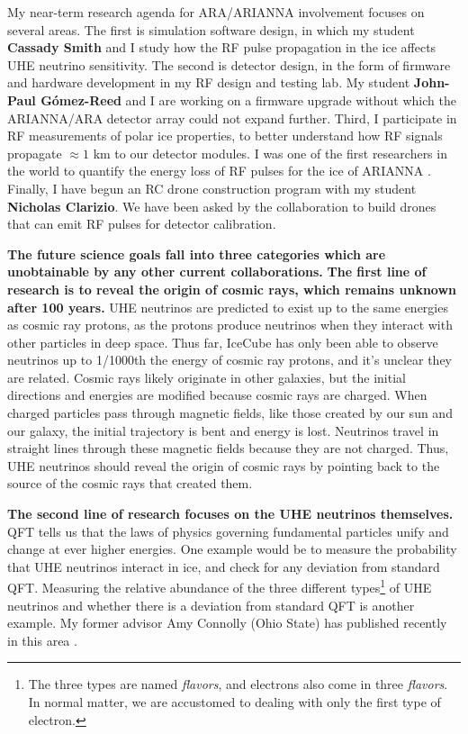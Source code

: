 \documentclass[../../main.tex]{subfiles}
\begin{document}
My near-term research agenda for ARA/ARIANNA involvement focuses on several areas.  The first is simulation software design, in which my student \textbf{Cassady Smith} and I study how the RF pulse propagation in the ice affects UHE neutrino sensitivity.  The second is detector design, in the form of firmware and hardware development in my RF design and testing lab.  My student \textbf{John-Paul G\'{o}mez-Reed} and I are working on a firmware upgrade without which the ARIANNA/ARA detector array could not expand further.  Third, I participate in RF measurements of polar ice properties, to better understand how RF signals propagate $\approx 1$ km to our detector modules.  I was one of the first researchers in the world to quantify the energy loss of RF pulses for the ice of ARIANNA \cite{hanson2015}. Finally, I have begun an RC drone construction program with my student \textbf{Nicholas Clarizio}.  We have been asked by the collaboration to build drones that can emit RF pulses for detector calibration.  \\ \hspace{0.1cm}

\textbf{The future science goals fall into three categories which are unobtainable by any other current collaborations.}  \textbf{The first line of research is to reveal the origin of cosmic rays, which remains unknown after 100 years.}  UHE neutrinos are predicted to exist up to the same energies as cosmic ray protons, as the protons produce neutrinos when they interact with other particles in deep space.  Thus far, IceCube has only been able to observe neutrinos up to 1/1000th the energy of cosmic ray protons, and it's unclear they are related.  Cosmic rays likely originate in other galaxies, but the initial directions and energies are modified because cosmic rays are charged.  When charged particles pass through magnetic fields, like those created by our sun and our galaxy, the initial trajectory is bent and energy is lost.  Neutrinos travel in straight lines through these magnetic fields because they are not charged.  Thus, UHE neutrinos should reveal the origin of cosmic rays by pointing back to the source of the cosmic rays that created them. \\ \hspace{0.1cm}

\textbf{The second line of research focuses on the UHE neutrinos themselves.}  QFT tells us that the laws of physics governing fundamental particles unify and change at ever higher energies.  One example would be to measure the probability that UHE neutrinos interact in ice, and check for any deviation from standard QFT.  Measuring the relative abundance of the three different types\footnote{The three types are named \textit{flavors}, and electrons also come in three \textit{flavors}.  In normal matter, we are accustomed to dealing with only the first type of electron.} of UHE neutrinos and whether there is a deviation from standard QFT is another example.  My former advisor Amy Connolly (Ohio State) has published recently in this area \cite{bustamante2017measurement} \cite{connolly2011calculation}. \\ \hspace{0.1cm}
\end{document}
